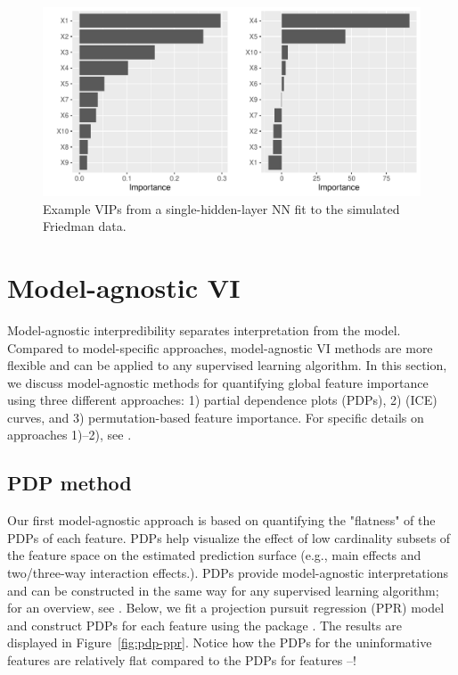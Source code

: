 \begin{figure}[!htb]
  \centering 
  \includegraphics[width=1\linewidth]{figures/vip-model-nn} 
  \caption{Example VIPs from a single-hidden-layer NN fit to the simulated Friedman data.}
  \label{fig:vip-earth}
\end{figure}


\section{Model-agnostic VI}

Model-agnostic interpredibility separates interpretation from the model. Compared to model-specific approaches, model-agnostic VI methods are more flexible and can be applied to any supervised learning algorithm. In this section, we discuss model-agnostic methods for quantifying global feature importance using three different approaches: 1) partial dependence plots (PDPs), 2)  (ICE) curves, and 3) permutation-based feature importance. For specific details on approaches 1)--2), see \citet{greenwell-simple-2018}.


\subsection{PDP method}

Our first model-agnostic approach is based on quantifying the "flatness" of the PDPs of each feature. PDPs help visualize the effect of low cardinality subsets of the feature space on the estimated prediction surface (e.g., main effects and two/three-way interaction effects.). PDPs provide model-agnostic interpretations and can be constructed in the same way for any supervised learning algorithm; for an overview, see \citet{greenwell-pdp-2017}. Below, we fit a projection pursuit regression (PPR) model and construct PDPs for each feature using the  package \citet{greenwell-pdp-2017}. The results are displayed in Figure~\ref{fig:pdp-ppr}. Notice how the PDPs for the uninformative features are relatively flat compared to the PDPs for features --!

